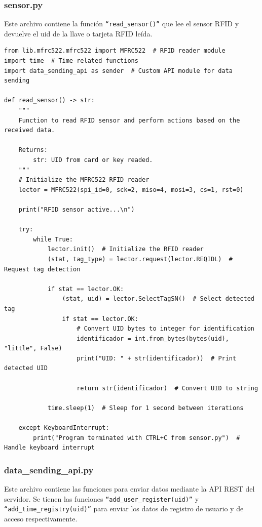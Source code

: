\documentclass{article}
\begin{document}
\subsubsection{sensor.py}
Este archivo contiene la función \texttt{``read\_sensor()''} que lee el sensor RFID y devuelve el uid de la llave o tarjeta RFID leída.
\begin{lstlisting}
from lib.mfrc522.mfrc522 import MFRC522  # RFID reader module
import time  # Time-related functions
import data_sending_api as sender  # Custom API module for data sending

def read_sensor() -> str:
    """
    Function to read RFID sensor and perform actions based on the received data.

    Returns:
        str: UID from card or key readed.
    """
    # Initialize the MFRC522 RFID reader
    lector = MFRC522(spi_id=0, sck=2, miso=4, mosi=3, cs=1, rst=0)

    print("RFID sensor active...\n")

    try:
        while True:
            lector.init()  # Initialize the RFID reader
            (stat, tag_type) = lector.request(lector.REQIDL)  # Request tag detection

            if stat == lector.OK:
                (stat, uid) = lector.SelectTagSN()  # Select detected tag
                if stat == lector.OK:
                    # Convert UID bytes to integer for identification
                    identificador = int.from_bytes(bytes(uid), "little", False)
                    print("UID: " + str(identificador))  # Print detected UID

                    return str(identificador)  # Convert UID to string
                
            time.sleep(1)  # Sleep for 1 second between iterations

    except KeyboardInterrupt:
        print("Program terminated with CTRL+C from sensor.py")  # Handle keyboard interrupt
\end{lstlisting}

\subsubsection{data\_sending\_api.py}
Este archivo contiene las funciones para enviar datos mediante la API REST del servidor.
Se tienen las funciones \texttt{``add\_user\_register(uid)''} y \texttt{``add\_time\_registry(uid)''} para enviar los datos de registro de usuario y de acceso respectivamente.
\end{document}
